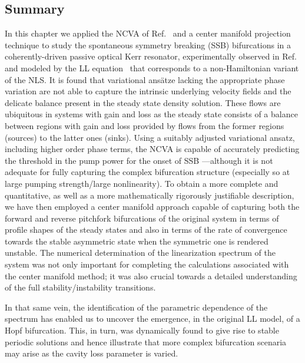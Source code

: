 \subsection{Summary
\label{secConclusion}}
%
In this chapter we applied the NCVA of Ref.~\cite{JuliaNCVA} and a center manifold projection technique to
study the spontaneous symmetry breaking (SSB) bifurcations in a 
coherently-driven passive optical Kerr resonator, experimentally
observed in Ref.~\cite{XuCoen} and modeled by the LL equation~\cite{LL} that corresponds to a 
non-Hamiltonian variant of the NLS.
%
It is found that variational ans\"atze lacking the appropriate 
phase variation are not able to capture the intrinsic underlying
velocity fields and the delicate
balance present in the steady state density solution.
%
These flows are ubiquitous in systems with gain and loss as
the steady state consists of a balance between regions with
gain and loss provided by flows from the former regions (sources) 
to the latter ones (sinks).
%
Using a suitably adjusted variational ansatz, including higher order
phase terms, the NCVA is capable of accurately predicting the
threshold in the pump power for the onset of SSB
---although it is not adequate for fully capturing the complex
bifurcation structure (especially so at large pumping strength/large
nonlinearity). 
%
To obtain a more complete and quantitative, as well as 
a more mathematically rigorously justifiable description, 
we have then employed a center manifold approach 
capable of capturing both the
forward and reverse pitchfork bifurcations of the
original system in terms of profile shapes of the steady states
and also in terms of the rate of convergence towards the
stable asymmetric state when the symmetric one is rendered
unstable. The numerical determination of the linearization spectrum
of the system was not only important for completing the calculations
associated with the center manifold method; it was also crucial towards
a detailed understanding of the full stability/instability
transitions.

In that same vein, 
the identification of the parametric dependence of the spectrum has
enabled us to uncover the emergence, in the original LL model, of
 a Hopf bifurcation. This, in turn, 
was dynamically found to give rise to stable periodic solutions
and hence illustrate that more complex bifurcation scenaria may arise
as the cavity loss parameter is varied.
%

